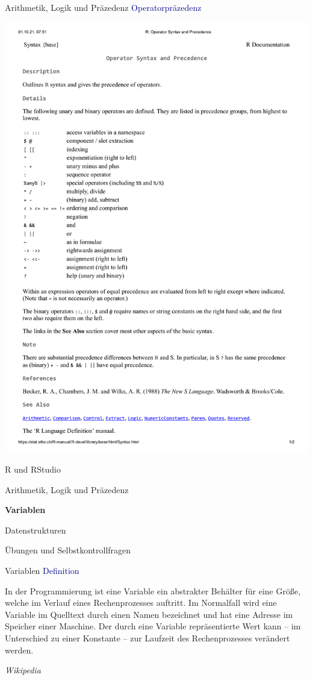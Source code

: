 \documentclass[
  8pt,
  ignorenonframetext,
]{beamer}
\begin{document}
\begin{frame}{Arithmetik, Logik und Präzedenz}
\protect\hypertarget{arithmetik-logik-und-pruxe4zedenz-6}{}
\textcolor{darkblue}{Operatorpräzedenz}

\begin{center}\includegraphics[width=0.7\linewidth]{2_Abbildungen/pds_2_precedence} \end{center}
\end{frame}

\begin{frame}{}
\protect\hypertarget{section-5}{}
\large
\vfill
{}

R und RStudio

Arithmetik, Logik und Präzedenz

\textbf{Variablen}

Datenstrukturen

Übungen und Selbstkontrollfragen
\end{frame}

\begin{frame}{Variablen}
\protect\hypertarget{variablen}{}
\textcolor{darkblue}{Definition} \vspace{5mm}

\small

In der Programmierung ist eine Variable ein abstrakter Behälter für eine
Größe, welche im Verlauf eines Rechenprozesses auftritt. Im Normalfall
wird eine Variable im Quelltext durch einen Namen bezeichnet und hat
eine Adresse im Speicher einer Maschine. Der durch eine Variable
repräsentierte Wert kann -- im Unterschied zu einer Konstante -- zur
Laufzeit des Rechenprozesses verändert werden.

\begin{flushright}
\textit{Wikipedia}
\end{flushright}
\end{frame}
\end{document}
